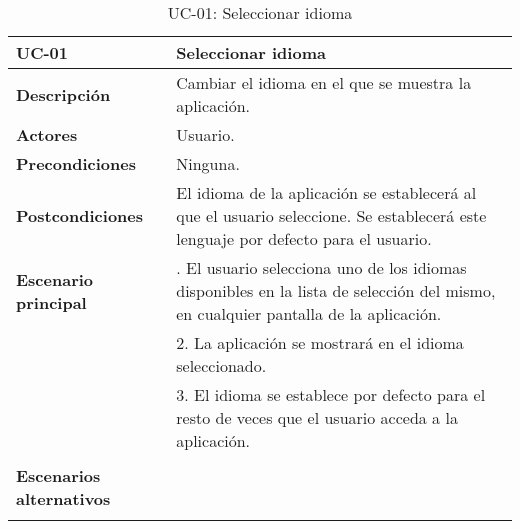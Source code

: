 \begin{table}[H]
  \begin{center}
    \begin{tabularx}{16.4cm}{|l|X|}
      \hline
      \textbf{UC-01} & \textbf{Seleccionar idioma}\\
      \hline
      \textbf{Descripción} & Cambiar el idioma en el que se muestra la aplicación.\\
      \hline
      \textbf{Actores} & Usuario.\\
      \hline
      \textbf{Precondiciones} & Ninguna.\\
      \hline
      \textbf{Postcondiciones} & El idioma de la aplicación se establecerá al que el usuario seleccione. Se establecerá este lenguaje por defecto para el usuario.\\
      \hline
      \textbf{Escenario principal} & \smallskip 1. El usuario selecciona uno de los idiomas disponibles en la lista de selección del mismo, en cualquier pantalla de la aplicación.\\
      & 2. La aplicación se mostrará en el idioma seleccionado.\\
      & 3. El idioma se establece por defecto para el resto de veces que el usuario acceda a la aplicación.\\
      & \\
      \hline
      \textbf{Escenarios alternativos} & \\
      & \\
      \hline
    \end{tabularx}
    \caption{UC-01: Seleccionar idioma}
    \label{tab:casousoselidioma}
  \end{center}
\end{table}


